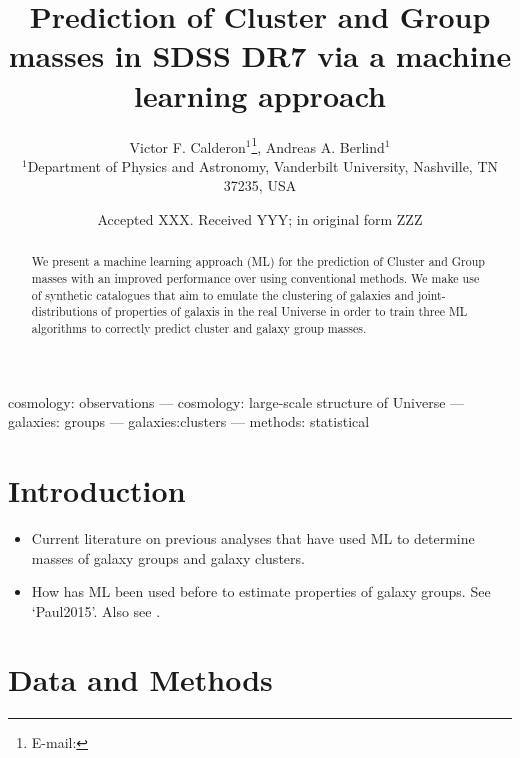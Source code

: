 \documentclass[useAMS,usenatbib, usedcolumn]{mnras}
\title{Prediction of Cluster and Group masses in SDSS DR7 via a machine learning approach}
\author[Calderon et al.]{%
Victor F. Calderon$^{1}$\thanks{E-mail:  \mailto{victor.calderon@vanderbilt.edu}},
Andreas A. Berlind$^{1}$\vspace*{0.2em} \\ 
$^{1}$Department of Physics and Astronomy, Vanderbilt University, Nashville, TN 37235, USA
}
\date{Accepted XXX. Received YYY; in original form ZZZ}
\begin{document}
\label{firstpage}
\pagerange{\pageref{firstpage}--\pageref{lastpage}}
\maketitle

\begin{abstract}
We present a machine learning approach (ML) for the prediction of 
Cluster and Group masses with an improved performance over
using conventional methods. We make use of synthetic catalogues
that aim to emulate the clustering of galaxies and joint-distributions
of properties of galaxis in the real Universe in order to train
three ML algorithms to correctly predict cluster and galaxy group masses.
\end{abstract}

\begin{keywords}
cosmology: observations --- cosmology: large-scale structure 
            of Universe --- galaxies: groups --- galaxies:clusters
            --- methods: statistical
\end{keywords}


\section{Introduction}
\label{sec:intro}

\begin{itemize}[leftmargin=0.5\parindent, labelsep=0.5\parindent]
    \item
    Current literature on previous analyses that have used ML to
    determine masses of galaxy groups and galaxy clusters.

    \item
    How has ML been used before to estimate properties of
    galaxy groups. See `Paul2015'. Also see \citet{Ntampaka2015}.

\end{itemize}


\section{Data and Methods}
\label{sec:data_meas}
\end{document}
